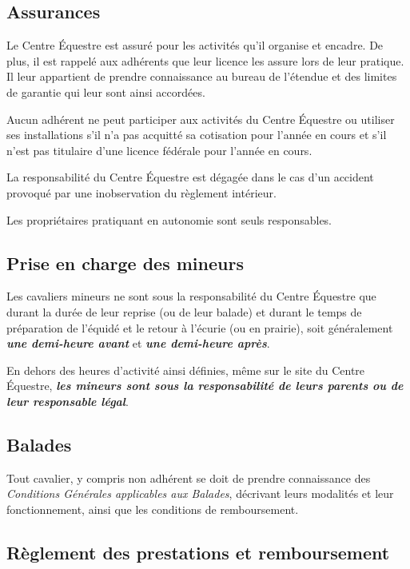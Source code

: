\documentclass[11pt,a4paper]{article}
\begin{document}
   \subsection{Assurances}\label{subsec:assurances}
   Le Centre Équestre est assuré pour les activités qu'il organise et encadre.
   De plus, il est rappelé aux adhérents que leur licence les assure lors de leur pratique.
   Il leur appartient de prendre connaissance au bureau de l'étendue et des limites de garantie qui leur sont ainsi accordées.

   Aucun adhérent ne peut participer aux activités du Centre Équestre ou utiliser ses installations s'il n'a pas acquitté sa cotisation pour l'année en cours et s'il n'est pas titulaire d'une licence fédérale pour l'année en cours.

   La responsabilité du Centre Équestre est dégagée dans le cas d'un accident provoqué par une inobservation du règlement intérieur.

   Les propriétaires pratiquant en autonomie sont seuls responsables.

   \subsection{Prise en charge des mineurs}\label{subsec:prise-en-charge-des-enfants-mineurs}
   Les cavaliers mineurs ne sont sous la responsabilité du Centre Équestre que durant la durée de leur reprise (ou de leur balade) et durant le temps de préparation de l'équidé et le retour à l'écurie (ou en prairie), soit généralement \textit{\textbf{une demi-heure avant}} et \textit{\textbf{une demi-heure après}}.

   En dehors des heures d'activité ainsi définies, même sur le site du Centre Équestre, \textit{\textbf{les mineurs sont sous la responsabilité de leurs parents ou de leur responsable légal}}.

   \subsection{Balades}\label{subsec:balades}

   Tout cavalier, y compris non adhérent se doit de prendre connaissance des \textit{Conditions Générales applicables aux Balades}, décrivant leurs modalités et leur fonctionnement, ainsi que les conditions de remboursement.


   \subsection{Règlement des prestations et remboursement}\label{subsec:reglement-des-prestations-et-remboursement}
\end{document}
